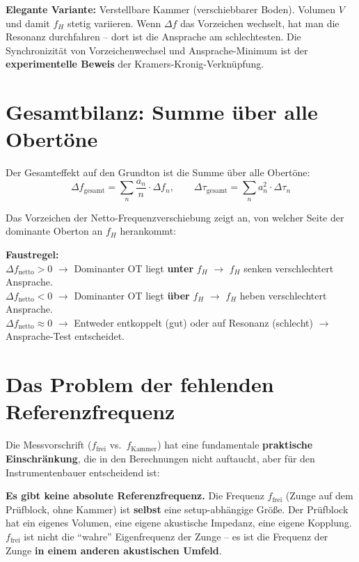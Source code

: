 \documentclass[11pt,a4paper]{article}
\begin{document}
\textbf{Elegante Variante:} Verstellbare Kammer (verschiebbarer Boden). Volumen $V$ und damit $f_H$ stetig variieren. Wenn $\Delta f$ das Vorzeichen wechselt, hat man die Resonanz durchfahren -- dort ist die Ansprache am schlechtesten. Die Synchronizität von Vorzeichenwechsel und Ansprache-Minimum ist der \textbf{experimentelle Beweis} der Kramers-Kronig-Verknüpfung.

\section{Gesamtbilanz: Summe über alle Obertöne}

Der Gesamteffekt auf den Grundton ist die Summe über alle Obertöne:
\begin{equation}
\Delta f_\text{gesamt} = \sum_n \frac{a_n}{n} \cdot \Delta f_n, \qquad
\Delta\tau_\text{gesamt} = \sum_n a_n^2 \cdot \Delta\tau_n
\end{equation}

Das Vorzeichen der Netto-Frequenzverschiebung zeigt an, von welcher Seite der dominante Oberton an $f_H$ herankommt:

\begin{keybox}
\textbf{Faustregel:}\\
$\Delta f_\text{netto} > 0$ $\to$ Dominanter OT liegt \textbf{unter} $f_H$ $\to$ $f_H$ senken verschlechtert Ansprache.\\
$\Delta f_\text{netto} < 0$ $\to$ Dominanter OT liegt \textbf{über} $f_H$ $\to$ $f_H$ heben verschlechtert Ansprache.\\
$\Delta f_\text{netto} \approx 0$ $\to$ Entweder entkoppelt (gut) oder auf Resonanz (schlecht) $\to$ Ansprache-Test entscheidet.
\end{keybox}

\section{Das Problem der fehlenden Referenzfrequenz}

Die Messvorschrift ($f_\text{frei}$ vs.\ $f_\text{Kammer}$) hat eine fundamentale \textbf{praktische Einschränkung}, die in den Berechnungen nicht auftaucht, aber für den Instrumentenbauer entscheidend ist:

\begin{warnbox}
\textbf{Es gibt keine absolute Referenzfrequenz.} Die Frequenz $f_\text{frei}$ (Zunge auf dem Prüfblock, ohne Kammer) ist \textbf{selbst} eine setup-abhängige Größe. Der Prüfblock hat ein eigenes Volumen, eine eigene akustische Impedanz, eine eigene Kopplung. $f_\text{frei}$ ist nicht die ``wahre'' Eigenfrequenz der Zunge -- es ist die Frequenz der Zunge \textbf{in einem anderen akustischen Umfeld}.
\end{warnbox}
\end{document}
